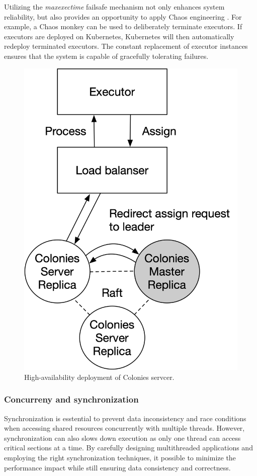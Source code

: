\documentclass{article}
\begin{document}
Utilizing the \emph{maxexectime} failsafe mechanism not only enhances system reliability, but also provides an opportunity to apply Chaos engineering \cite{chaos_engineering}. For example, a Chaos monkey can be used to deliberately terminate executors. If executors are deployed on Kubernetes, Kubernetes will then automatically redeploy terminated executors. The constant replacement of executor instances ensures that the system is capable of gracefully tolerating failures.

\begin{figure}[h]
	\centering
    \includegraphics[scale=0.5]{raft.png}
	\caption{High-availability deployment of Colonies servcer.}
	\label{fig:ha_deployment}
\end{figure}

\subsubsection{Concurreny and synchronization}
Synchronization is esstential to prevent data inconsistency and race conditions when accessing shared resources concurrently with multiple threads. However, synchronization can also slows down execution as only one thread can access critical sections at a time. By carefully designing multithreaded applications and employing the right synchronization techniques, it possible to minimize the performance impact while still ensuring data consistency and correctness.  
\end{document}
